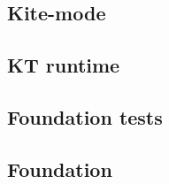 
\subsection{Kite-mode}
\label{kite-mode}


\subsection{KT runtime}
\label{kt-runtime}


\subsection{Foundation tests}
\label{sec:foundation-tests}


\subsection{Foundation}
\label{foundation}

